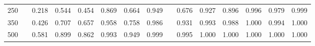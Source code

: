 % 
\begin{tabular}{ccccccccccccccc}
  \hline
  \hline
250 &  & 0.218 & 0.544 & 0.454 & 0.869 & 0.664 & 0.949 &  & 0.676 & 0.927 & 0.896 & 0.996 & 0.979 & 0.999 \\ 
  350 &  & 0.426 & 0.707 & 0.657 & 0.958 & 0.758 & 0.986 &  & 0.931 & 0.993 & 0.988 & 1.000 & 0.994 & 1.000 \\ 
  500 &  & 0.581 & 0.899 & 0.862 & 0.993 & 0.949 & 0.999 &  & 0.995 & 1.000 & 1.000 & 1.000 & 1.000 & 1.000 \\ 
   \hline
\end{tabular}
